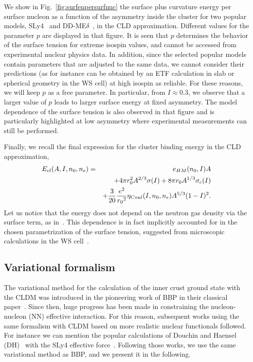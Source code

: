 %
We show in Fig.~\ref{fig:surfenpersurfnuc} the surface plus curvature energy
per surface nucleon as a function of the asymmetry inside the cluster for two
popular models, SLy4~\cite{Chabanat1998} and DD-ME$\delta$~\cite{RocaMaza2011},
in the CLD approximation. Different values for the parameter $p$ are displayed 
in that figure. It is seen that $p$ determines the behavior of the surface
tension for extreme isospin values, and cannot be accessed from experimental
nuclear physics data. {In addition, since the selected popular models contain
parameters that are adjusted to the same data, we cannot consider their 
predictions (as for instance can be obtained by an ETF calculation in slab or 
spherical geometry in the WS cell) at high isospin as reliable. 
For these reasons, we will keep $p$ as 
a free parameter.} In particular, from $I \approx 0.3$, we observe that a 
larger value of $p$ leads to larger surface energy at fixed asymmetry. The
model dependence of the surface tension is also observed in that figure and is
particularly highlighted at low asymmetry where experimental measurements can 
still be performed.

Finally, we recall the final expression for the cluster binding energy in the
CLD approximation,
%
\begin{eqnarray}
  E_{cl}(A,I,n_0,n_e) =&& e_{HM}(n_0, I)A \notag \\
          &&+ 4\pi r_0^2A^{2/3}\sigma(I) + 8\pi r_0A^{1/3}\sigma_c(I) \notag \\
          &&+ \frac{3}{20}\frac{e^2}{{r_0}^2}\eta_{Coul}(I,n_0,n_e)A^{5/3}(1-I)^2.
          \label{eq:enuc}
\end{eqnarray}
%
Let us notice that the energy does not depend on the neutron gas density via
the surface term, as in~\cite{BBP}. This dependence is in fact implicitly
accounted for in the chosen parametrization of the surface tension, suggested 
from microscopic calculations in the WS cell~\cite{Ravenhall1983}.

\subsection{Variational formalism}\label{subsec:formalism}

The variational method for the calculation of the inner crust ground state
with the CLDM was introduced in the pioneering work of BBP 
in their classical paper~\cite{BBP}. Since then, huge progress has been
made in constraining the nucleon-nucleon (NN) effective interaction. For this 
reason, subsequent works using the same formalism with CLDM based on more 
realistic nuclear functionals followed. For instance we can mention the popular 
calculations of Douchin and Haensel (DH)~\cite{Douchin2000a, Douchin2000b} with 
the SLy4 effective force~\cite{Chabanat1998}. Following those works, we use the 
same variational method as BBP, and we present it in the following.

